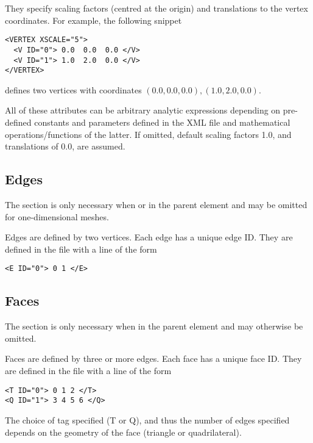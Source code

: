 They specify scaling factors (centred at the origin) and translations to the
vertex coordinates. For example, the following snippet
\begin{lstlisting}[style=XMLStyle] 
<VERTEX XSCALE="5">
  <V ID="0"> 0.0  0.0  0.0 </V>
  <V ID="1"> 1.0  2.0  0.0 </V>
</VERTEX>
\end{lstlisting}
defines two vertices with coordinates $(0.0,0.0,0.0), (1.0,2.0,0.0)$.

All of these attributes can be arbitrary analytic expressions depending on pre-
defined constants and parameters defined in the XML file and
mathematical operations/functions of the latter. If omitted, default scaling
factors 1.0, and translations of 0.0, are assumed.


\subsection{Edges}
\begin{tipbox}
    The  section is only necessary when  or
     in the parent  element and may be omitted for
    one-dimensional meshes.
\end{tipbox}

Edges are defined by two vertices. Each edge has a unique edge ID. They are
defined in the file with a line of the form 
\begin{lstlisting}[style=XMLStyle]
<E ID="0"> 0 1 </E>
\end{lstlisting}


\subsection{Faces}
\begin{tipbox}
    The  section is only necessary when  in the
    parent  element and may otherwise be omitted.
\end{tipbox}

Faces are defined by three or more edges. Each face has a unique face ID. They
are defined in the file with a line of the form
\begin{lstlisting}[style=XMLStyle]
<T ID="0"> 0 1 2 </T>
<Q ID="1"> 3 4 5 6 </Q>
\end{lstlisting}
The choice of tag specified (T or Q), and thus the number of edges specified depends on the geometry of the face (triangle or quadrilateral).


